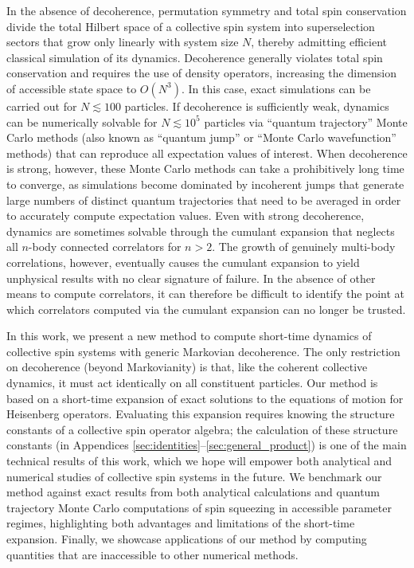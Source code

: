 \documentclass[aps,pra,twocolumn,longbibliography]{revtex4-2}
\newcommand{\p}[1]{\left( #1 \right)} %
\newcommand{\1}{\mathds{1}}
\begin{document}
In the absence of decoherence, permutation symmetry and total spin
conservation divide the total Hilbert space of a collective spin
system into superselection sectors that grow only linearly with system
size $N$, thereby admitting efficient classical simulation of its
dynamics.  Decoherence generally violates total spin conservation and
requires the use of density operators, increasing the dimension of
accessible state space to $O\p{N^3}$\cite{hartmann2016generalized,
  xu2013simulating}.  In this case, exact simulations can be carried
out for $N\lesssim100$ particles.  If decoherence is sufficiently
weak, dynamics can be numerically solvable for $N\lesssim10^5$
particles via ``quantum trajectory'' Monte Carlo
methods\cite{plenio1998quantumjump, zhang2018montecarlo} (also known
as ``quantum jump'' or ``Monte Carlo wavefunction'' methods) that can
reproduce all expectation values of interest.  When decoherence is
strong, however, these Monte Carlo methods can take a prohibitively
long time to converge, as simulations become dominated by incoherent
jumps that generate large numbers of distinct quantum trajectories
that need to be averaged in order to accurately compute expectation
values.  Even with strong decoherence, dynamics are sometimes solvable
through the cumulant expansion\cite{meiser2010steadystate} that
neglects all $n$-body connected correlators for $n>2$.  The growth of
genuinely multi-body correlations, however, eventually causes the
cumulant expansion to yield unphysical results with no clear signature
of failure.  In the absence of other means to compute correlators, it
can therefore be difficult to identify the point at which correlators
computed via the cumulant expansion can no longer be trusted.

In this work, we present a new method to compute short-time dynamics
of collective spin systems with generic Markovian decoherence.  The
only restriction on decoherence (beyond Markovianity) is that, like
the coherent collective dynamics, it must act identically on all
constituent particles.  Our method is based on a short-time expansion
of exact solutions to the equations of motion for Heisenberg
operators.  Evaluating this expansion requires knowing the structure
constants of a collective spin operator algebra; the calculation of
these structure constants (in Appendices
\ref{sec:identities}--\ref{sec:general_product}) is one of the main
technical results of this work, which we hope will empower both
analytical and numerical studies of collective spin systems in the
future.  We benchmark our method against exact results from both
analytical calculations and quantum trajectory Monte Carlo
computations of spin squeezing in accessible parameter regimes,
highlighting both advantages and limitations of the short-time
expansion.  Finally, we showcase applications of our method by
computing quantities that are inaccessible to other numerical methods.
\end{document}
